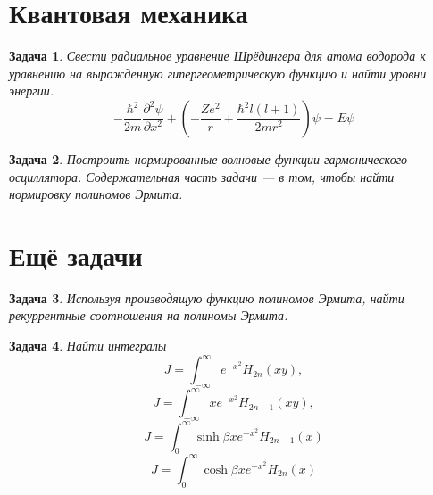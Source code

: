 \documentclass{article}
\newtheorem{problem}{Задача}
\begin{document}
\section{Квантовая механика}
\begin{problem}
    Свести радиальное уравнение Шрёдингера для атома водорода к уравнению на 
    вырожденную гипергеометрическую функцию
    и найти уровни энергии.
    \begin{equation}
        -\frac{\hbar^2}{2m}\frac{\partial^2 \psi}{\partial x^2} + 
            \left(-\frac{Ze^2}{r} + \frac{\hbar^2l(l+1)}{2mr^2}\right)\psi = E\psi
    \end{equation}
\end{problem}
\begin{problem}
    Построить нормированные волновые функции гармонического осциллятора. Содержательная 
    часть задачи --- в том, чтобы найти нормировку полиномов Эрмита.
\end{problem}
\section{Ещё задачи}
\begin{problem}
    Используя производящую функцию полиномов Эрмита, найти рекуррентные соотношения на полиномы
    Эрмита.
\end{problem}
\begin{problem}
    Найти интегралы
    \begin{equation}
        J = \int_{-\infty}^\infty e^{-x^2} H_{2n}(xy),
    \end{equation}
    \begin{equation}
        J = \int_{-\infty}^\infty x e^{-x^2} H_{2n-1}(xy),
    \end{equation}
    \begin{equation}
        J = \int_{0}^\infty \sinh{\beta x} e^{-x^2} H_{2n-1}(x)
    \end{equation}
    \begin{equation}
        J = \int_{0}^\infty \cosh{\beta x} e^{-x^2} H_{2n}(x)
    \end{equation}
\end{problem}
\end{document}
